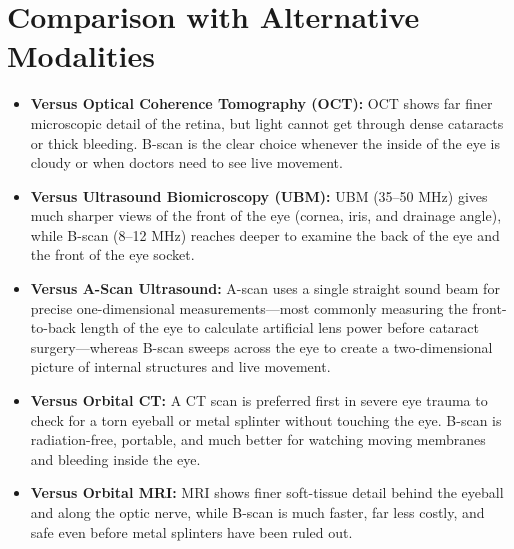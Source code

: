 \section{Comparison with Alternative Modalities}
\begin{itemize}
    \item \textbf{Versus Optical Coherence Tomography (OCT):} OCT shows far finer microscopic detail of the retina, but light cannot get through dense cataracts or thick bleeding. B-scan is the clear choice whenever the inside of the eye is cloudy or when doctors need to see live movement.
    \item \textbf{Versus Ultrasound Biomicroscopy (UBM):} UBM (35--50 MHz) gives much sharper views of the front of the eye (cornea, iris, and drainage angle), while B-scan (8--12 MHz) reaches deeper to examine the back of the eye and the front of the eye socket.
    \item \textbf{Versus A-Scan Ultrasound:} A-scan uses a single straight sound beam for precise one-dimensional measurements---most commonly measuring the front-to-back length of the eye to calculate artificial lens power before cataract surgery---whereas B-scan sweeps across the eye to create a two-dimensional picture of internal structures and live movement.
    \item \textbf{Versus Orbital CT:} A CT scan is preferred first in severe eye trauma to check for a torn eyeball or metal splinter without touching the eye. B-scan is radiation-free, portable, and much better for watching moving membranes and bleeding inside the eye.
    \item \textbf{Versus Orbital MRI:} MRI shows finer soft-tissue detail behind the eyeball and along the optic nerve, while B-scan is much faster, far less costly, and safe even before metal splinters have been ruled out.
\end{itemize}

